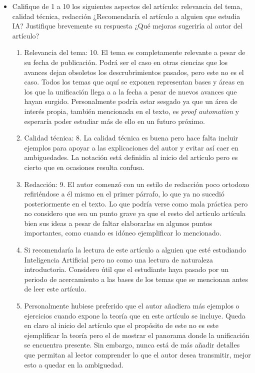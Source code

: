 \begin{enumerate}
\begin{itemize}
        \item Califique de 1 a 10 los siguientes aspectos del artículo: relevancia del tema, calidad técnica, redacción ¿Recomendaría el artículo a alguien que estudia IA? Justifique brevemente su respuesta ¿Qué mejoras sugeriría al autor del artículo?
        \begin{enumerate}
            \item Relevancia del tema: 10. El tema es completamente relevante a pesar de su fecha de publicación. Podrá ser el caso en otras ciencias que los avances dejan obsoletos los descrubrimientos pasados, pero este no es el caso. Todos los temas que aquí se exponen representan bases y áreas en los que la unificación llega a a la fecha a pesar de nuevos avances que hayan surgido. Personalmente podría estar sesgado ya que un área de interés propia, también mencionada en el texto, es \textit{proof automation} y esperaría poder estudiar más de ello en un futuro próximo.
            \item Calidad técnica: 8. La calidad técnica es buena pero hace falta incluir ejemplos para apoyar a las explicaciones del autor y evitar así caer en ambiguedades. La notación está definidia al inicio del artículo pero es cierto que en ocasiones resulta confusa.
            \item Redacción: 9. El autor comenzó con un estilo de redacción poco ortodoxo refiriéndose a él mismo en el primer párrafo, lo que ya no sucedió posteriormente en el texto. Lo que podría verse como mala práctica pero no considero que sea un punto grave ya que el resto del artículo artícula bien sus ideas a pesar de faltar elaborarlas en algunos puntos importantes, como cuando es idóneo ejemplificar lo mencionado.
            \item Si recomendaría la lectura de este artículo a alguien que esté estudiando Inteligencia Artificial pero no como una lectura de naturaleza introductoria. Considero útil que el estudiante haya pasado por un periodo de acercamiento a las bases de los temas que se mencionan antes de leer este artículo.
            \item Personalmente hubiese preferido que el autor añadiera más ejemplos o ejercicios cuando expone la teoría que en este artículo se incluye. Queda en claro al inicio del artículo que el propósito de este no es este ejemplificar la teoría pero el de mostrar el panorama donde la unificación se encuentra presente. Sin embargo, nunca está de más añadir detalles que permitan al lector comprender lo que el autor desea transmitir, mejor esto a quedar en la ambiguedad.
        \end{enumerate}
    \end{itemize}


\end{enumerate}
